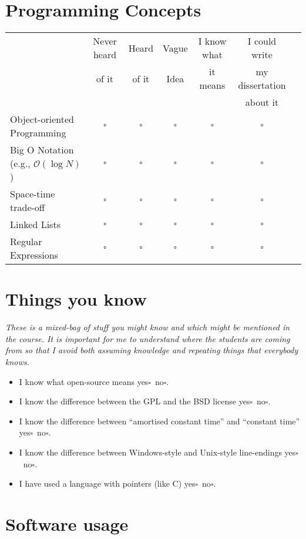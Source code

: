\documentclass[article,twoside]{memoir}
\newcommand*{\bigO}{\mathcal{O}}
\newcommand*{\checkbox}{$\square$}
\newcommand*{\yesno}{\hfill\mbox{yes\checkbox~no\checkbox}}
\newcommand{\header}[1]{\textsl{#1}}
\begin{document}
\section{Programming Concepts}
\begin{tabular}{lcccccc}
 \toprule
 & Never heard  & Heard & Vague & I know what & I could write    \\
 & of it        & of it & Idea  & it means    & my dissertation  \\
 &              &       &       &             &    about it      \\
 \midrule
Object-oriented Programming            &\checkbox &\checkbox &\checkbox &\checkbox &\checkbox \\
Big O Notation (e.g., $\bigO(\log N)$) &\checkbox &\checkbox &\checkbox &\checkbox &\checkbox \\
Space-time trade-off                   &\checkbox &\checkbox &\checkbox &\checkbox &\checkbox \\
Linked Lists                           &\checkbox &\checkbox &\checkbox &\checkbox &\checkbox \\
Regular Expressions                    &\checkbox &\checkbox &\checkbox &\checkbox &\checkbox \\
\end{tabular}


\section{Things you know}
\header{These is a mixed-bag of stuff you might know and which might be mentioned in the course. It is important for me to understand where the students are coming from so that I avoid both assuming knowledge and repeating things that everybody knows.}

\begin{itemize}
\item I know what open-source means \yesno.
\item I know the difference between the GPL and the BSD license \yesno.
\item I know the difference between ``amortised constant time'' and ``constant time'' \yesno.
\item I know the difference between Windows-style and Unix-style line-endings \yesno.
\item I have used a language with pointers (like C) \yesno.
\end{itemize}


\section{Software usage}
\end{document}
